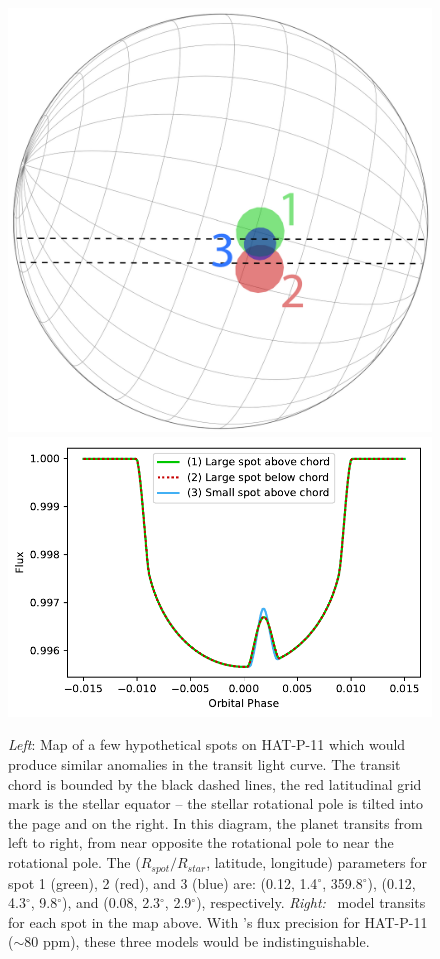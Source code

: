\begin{figure}
\centering
\includegraphics[scale=0.3]{stsp_hat_p_11/spot_degeneracy2.pdf}
\includegraphics[scale=0.6]{stsp_hat_p_11/spot_degeneracy.pdf}
\caption{\textit{Left}: Map of a few hypothetical spots on HAT-P-11 which would produce similar anomalies in the transit light curve.  The transit chord is bounded by the black dashed lines, the red latitudinal grid mark is the stellar equator -- the stellar rotational pole is tilted into the page and on the right. In this diagram, the planet transits from left to right, from near opposite the rotational pole to near the rotational pole. The ($R_{spot}/R_{star}$, latitude, longitude)  parameters for spot 1 (green), 2 (red), and 3 (blue) are: (0.12, 1.4$^\circ$, 359.8$^\circ$), (0.12, 4.3$^\circ$, 9.8$^\circ$), and (0.08, 2.3$^\circ$, 2.9$^\circ$), respectively. \textit{Right:} \stsp\ model transits for each spot in the map above. With \kepler's flux precision for HAT-P-11 ($\sim 80$ ppm), these three models would be indistinguishable.}
\label{fig:rp_degeneracy}
\end{figure}

